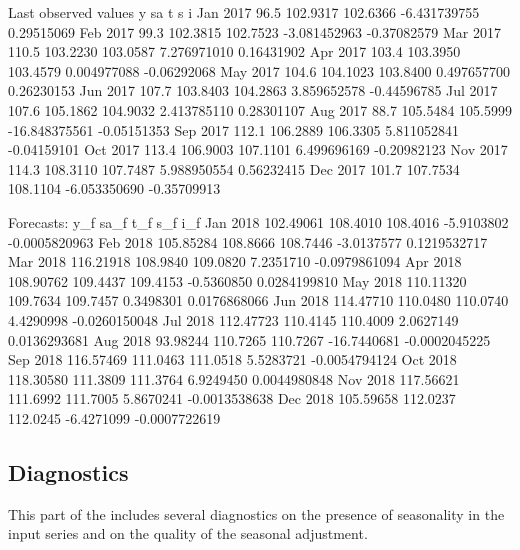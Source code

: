\documentclass[article]{jss}
\begin{document}
\begin{CodeChunk}


\begin{CodeOutput}
Last observed values
             y       sa        t             s           i
Jan 2017  96.5 102.9317 102.6366  -6.431739755  0.29515069
Feb 2017  99.3 102.3815 102.7523  -3.081452963 -0.37082579
Mar 2017 110.5 103.2230 103.0587   7.276971010  0.16431902
Apr 2017 103.4 103.3950 103.4579   0.004977088 -0.06292068
May 2017 104.6 104.1023 103.8400   0.497657700  0.26230153
Jun 2017 107.7 103.8403 104.2863   3.859652578 -0.44596785
Jul 2017 107.6 105.1862 104.9032   2.413785110  0.28301107
Aug 2017  88.7 105.5484 105.5999 -16.848375561 -0.05151353
Sep 2017 112.1 106.2889 106.3305   5.811052841 -0.04159101
Oct 2017 113.4 106.9003 107.1101   6.499696169 -0.20982123
Nov 2017 114.3 108.3110 107.7487   5.988950554  0.56232415
Dec 2017 101.7 107.7534 108.1104  -6.053350690 -0.35709913

Forecasts:
               y_f     sa_f      t_f         s_f           i_f
Jan 2018 102.49061 108.4010 108.4016  -5.9103802 -0.0005820963
Feb 2018 105.85284 108.8666 108.7446  -3.0137577  0.1219532717
Mar 2018 116.21918 108.9840 109.0820   7.2351710 -0.0979861094
Apr 2018 108.90762 109.4437 109.4153  -0.5360850  0.0284199810
May 2018 110.11320 109.7634 109.7457   0.3498301  0.0176868066
Jun 2018 114.47710 110.0480 110.0740   4.4290998 -0.0260150048
Jul 2018 112.47723 110.4145 110.4009   2.0627149  0.0136293681
Aug 2018  93.98244 110.7265 110.7267 -16.7440681 -0.0002045225
Sep 2018 116.57469 111.0463 111.0518   5.5283721 -0.0054794124
Oct 2018 118.30580 111.3809 111.3764   6.9249450  0.0044980848
Nov 2018 117.56621 111.6992 111.7005   5.8670241 -0.0013538638
Dec 2018 105.59658 112.0237 112.0245  -6.4271099 -0.0007722619
\end{CodeOutput}
\end{CodeChunk}

\hypertarget{diagnostics}{%
\subsection{Diagnostics}\label{diagnostics}}

This part of the  includes several diagnostics on the
presence of seasonality in the input series and on the quality of the
seasonal adjustment.
\end{document}
